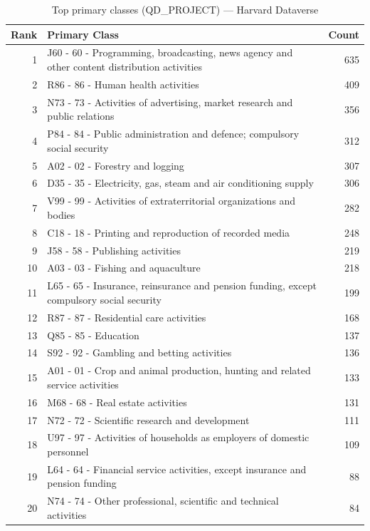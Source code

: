 \begin{table}[H]
    \centering
    \begin{tabular}{r p{10cm} r}
    \hline
    \textbf{Rank} & \textbf{Primary Class} & \textbf{Count} \\
    \hline
    1 & J60 - 60 - Programming, broadcasting, news agency and other content distribution activities & 635 \\
    2 & R86 - 86 - Human health activities & 409 \\
    3 & N73 - 73 - Activities of advertising, market research and public relations & 356 \\
    4 & P84 - 84 - Public administration and defence; compulsory social security & 312 \\
    5 & A02 - 02 - Forestry and logging & 307 \\
    6 & D35 - 35 - Electricity, gas, steam and air conditioning supply & 306 \\
    7 & V99 - 99 - Activities of extraterritorial organizations and bodies & 282 \\
    8 & C18 - 18 - Printing and reproduction of recorded media & 248 \\
    9 & J58 - 58 - Publishing activities & 219 \\
    10 & A03 - 03 - Fishing and aquaculture & 218 \\
    11 & L65 - 65 - Insurance, reinsurance and pension funding, except compulsory social security & 199 \\
    12 & R87 - 87 - Residential care activities & 168 \\
    13 & Q85 - 85 - Education & 137 \\
    14 & S92 - 92 - Gambling and betting activities & 136 \\
    15 & A01 - 01 - Crop and animal production, hunting and related service activities & 133 \\
    16 & M68 - 68 - Real estate activities & 131 \\
    17 & N72 - 72 - Scientific research and development & 111 \\
    18 & U97 - 97 - Activities of households as employers of domestic personnel & 109 \\
    19 & L64 - 64 - Financial service activities, except insurance and pension funding & 88 \\
    20 & N74 - 74 - Other professional, scientific and technical activities & 84 \\
    \hline
    \end{tabular}
    \caption{Top primary classes (QD\_PROJECT) --- Harvard Dataverse}
\end{table}

